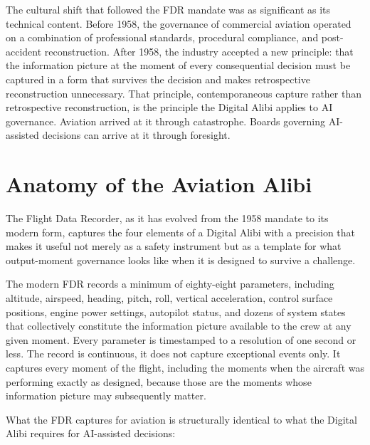 The cultural shift that followed the FDR mandate was as significant as its technical content. Before 1958, the governance of commercial aviation operated on a combination of professional standards, procedural compliance, and post-accident reconstruction. After 1958, the industry accepted a new principle: that the information picture at the moment of every consequential decision must be captured in a form that survives the decision and makes retrospective reconstruction unnecessary. That principle, contemporaneous capture rather than retrospective reconstruction, is the principle the Digital Alibi applies to AI governance. Aviation arrived at it through catastrophe. Boards governing AI-assisted decisions can arrive at it through foresight.

\scenebreak

\section{Anatomy of the Aviation Alibi}

The Flight Data Recorder, as it has evolved from the 1958 mandate to its modern form, captures the four elements of a Digital Alibi with a precision that makes it useful not merely as a safety instrument but as a template for what output-moment governance looks like when it is designed to survive a challenge.

The modern FDR records a minimum of eighty-eight parameters, including altitude, airspeed, heading, pitch, roll, vertical acceleration, control surface positions, engine power settings, autopilot status, and dozens of system states that collectively constitute the information picture available to the crew at any given moment. Every parameter is timestamped to a resolution of one second or less. The record is continuous, it does not capture exceptional events only. It captures every moment of the flight, including the moments when the aircraft was performing exactly as designed, because those are the moments whose information picture may subsequently matter.

What the FDR captures for aviation is structurally identical to what the Digital Alibi requires for AI-assisted decisions:

